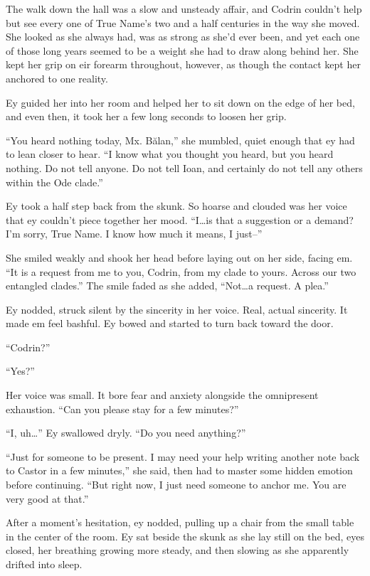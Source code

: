 The walk down the hall was a slow and unsteady affair, and Codrin couldn't help but see every one of True Name's two and a half centuries in the way she moved. She looked as she always had, was as strong as she'd ever been, and yet each one of those long years seemed to be a weight she had to draw along behind her. She kept her grip on eir forearm throughout, however, as though the contact kept her anchored to one reality.

Ey guided her into her room and helped her to sit down on the edge of her bed, and even then, it took her a few long seconds to loosen her grip.

``You heard nothing today, Mx. Bălan,'' she mumbled, quiet enough that ey had to lean closer to hear. ``I know what you thought you heard, but you heard nothing. Do not tell anyone. Do not tell Ioan, and certainly do not tell any others within the Ode clade.''

Ey took a half step back from the skunk. So hoarse and clouded was her voice that ey couldn't piece together her mood. ``I\ldots is that a suggestion or a demand? I'm sorry, True Name. I know how much it means, I just--''

She smiled weakly and shook her head before laying out on her side, facing em. ``It is a request from me to you, Codrin, from my clade to yours. Across our two entangled clades.'' The smile faded as she added, ``Not\ldots a request. A plea.''

Ey nodded, struck silent by the sincerity in her voice. Real, actual sincerity. It made em feel bashful. Ey bowed and started to turn back toward the door.

``Codrin?''

``Yes?''

Her voice was small. It bore fear and anxiety alongside the omnipresent exhaustion. ``Can you please stay for a few minutes?''

``I, uh\ldots{}'' Ey swallowed dryly. ``Do you need anything?''

``Just for someone to be present. I may need your help writing another note back to Castor in a few minutes,'' she said, then had to master some hidden emotion before continuing. ``But right now, I just need someone to anchor me. You are very good at that.''

After a moment's hesitation, ey nodded, pulling up a chair from the small table in the center of the room. Ey sat beside the skunk as she lay still on the bed, eyes closed, her breathing growing more steady, and then slowing as she apparently drifted into sleep.


